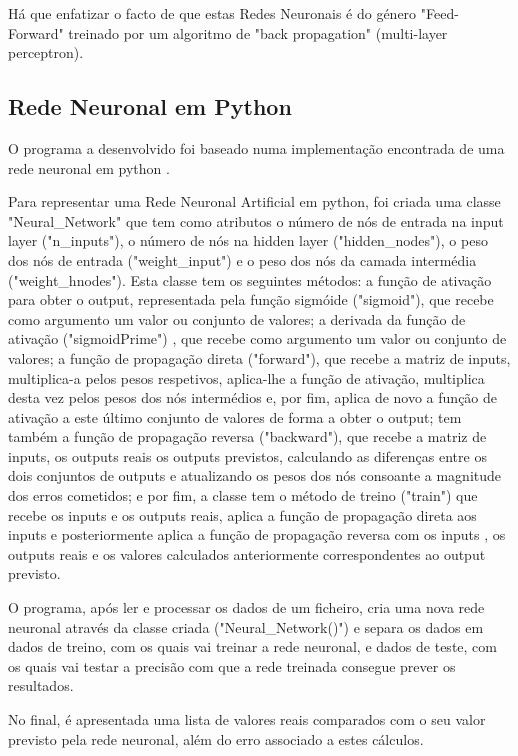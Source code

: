 \documentclass[conference]{IEEEtran}
\begin{document}
Há que enfatizar o facto de que estas Redes Neuronais é do género "Feed-Forward" treinado por um algoritmo de "back propagation" (multi-layer perceptron).


\subsection{Rede Neuronal em Python}
O programa a desenvolvido foi baseado numa implementação encontrada de uma rede neuronal em python \cite{b6}.

Para representar uma Rede Neuronal Artificial em python, foi criada uma classe "Neural\_Network" que tem como atributos o número de nós de entrada na input layer ("n\_inputs"), o número de nós na hidden layer ("hidden\_nodes"), o peso dos nós de entrada ("weight\_input") e o peso dos nós da camada intermédia ("weight\_hnodes").  Esta classe tem os seguintes métodos: a função de ativação para obter o output, representada pela função sigmóide ("sigmoid"), que recebe como argumento um valor ou conjunto de valores; a derivada da função de ativação ("sigmoidPrime") , que recebe como argumento um valor ou conjunto de valores; a função de propagação direta ("forward"), que recebe a matriz de inputs, multiplica-a pelos pesos respetivos, aplica-lhe a função de ativação, multiplica desta vez pelos pesos dos nós intermédios e, por fim, aplica de novo a função de ativação a este último conjunto de valores de forma a obter o output; tem também a função de propagação reversa ("backward"), que recebe a matriz  de inputs, os outputs reais os outputs previstos, calculando as diferenças entre os dois conjuntos de outputs e atualizando os pesos dos nós consoante a magnitude dos erros cometidos; e por fim, a classe tem o método de treino ("train") que recebe os inputs e os outputs reais, aplica a função de propagação direta aos inputs e posteriormente aplica a função de propagação reversa com os inputs , os outputs reais e os valores calculados anteriormente correspondentes ao output previsto.

O programa, após ler e processar os dados de um ficheiro, cria uma nova rede neuronal através da classe criada ("Neural\_Network()") e separa os dados em dados de treino, com os quais vai treinar a rede neuronal, e dados de teste, com os quais vai testar a precisão com que a rede treinada consegue prever os resultados. 

No final, é apresentada uma lista de valores reais comparados com o seu valor previsto pela rede neuronal, além do erro associado a estes cálculos.
\end{document}
